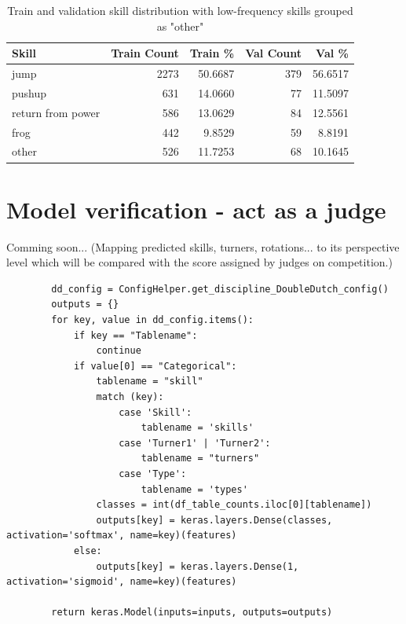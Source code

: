 \begin{table}[h!]
    \centering
    \begin{tabular}{|l|r|r|r|r|}
        \hline
        \textbf{Skill} & \textbf{Train Count} & \textbf{Train \%} & \textbf{Val Count} & \textbf{Val \%} \\
        \hline
        jump & 2273 & 50.6687 & 379 & 56.6517 \\
        pushup & 631 & 14.0660 & 77 & 11.5097 \\
        return from power & 586 & 13.0629 & 84 & 12.5561 \\
        frog & 442 & 9.8529 & 59 & 8.8191 \\
        other & 526 & 11.7253 & 68 & 10.1645 \\
        \hline
    \end{tabular}
    \caption{Train and validation skill distribution with low-frequency skills grouped as "other"}
    \label{tab:skill_distribution_grouped_final}
\end{table}


\section{Model verification - act as a judge}

Comming soon... (Mapping predicted skills, turners, rotations... to its perspective level which will be compared with the score assigned by judges on competition.)

\begin{listing}
    \begin{verbatim}
        dd_config = ConfigHelper.get_discipline_DoubleDutch_config()
        outputs = {}
        for key, value in dd_config.items():
            if key == "Tablename":
                continue
            if value[0] == "Categorical":
                tablename = "skill"
                match (key):
                    case 'Skill':
                        tablename = 'skills'
                    case 'Turner1' | 'Turner2':
                        tablename = "turners"
                    case 'Type':
                        tablename = 'types'
                classes = int(df_table_counts.iloc[0][tablename])
                outputs[key] = keras.layers.Dense(classes, activation='softmax', name=key)(features)
            else:
                outputs[key] = keras.layers.Dense(1, activation='sigmoid', name=key)(features)

        return keras.Model(inputs=inputs, outputs=outputs)
    \end{verbatim}
    \caption[]{}
    \label{code:keras-skill-top-layers}
\end{listing}


